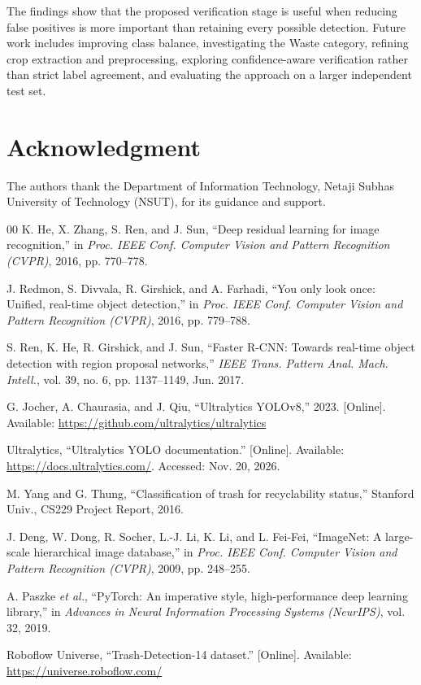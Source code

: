 \documentclass[conference]{IEEEtran}
\begin{document}
The findings show that the proposed verification stage is useful when reducing false positives is more important than retaining every possible detection. Future work includes improving class balance, investigating the Waste category, refining crop extraction and preprocessing, exploring confidence-aware verification rather than strict label agreement, and evaluating the approach on a larger independent test set.

\section*{Acknowledgment}
The authors thank the Department of Information Technology, Netaji Subhas University of Technology (NSUT), for its guidance and support.

\begin{thebibliography}{00}
K. He, X. Zhang, S. Ren, and J. Sun, ``Deep residual learning for image recognition,'' in \emph{Proc. IEEE Conf. Computer Vision and Pattern Recognition (CVPR)}, 2016, pp. 770--778.

J. Redmon, S. Divvala, R. Girshick, and A. Farhadi, ``You only look once: Unified, real-time object detection,'' in \emph{Proc. IEEE Conf. Computer Vision and Pattern Recognition (CVPR)}, 2016, pp. 779--788.

S. Ren, K. He, R. Girshick, and J. Sun, ``Faster R-CNN: Towards real-time object detection with region proposal networks,'' \emph{IEEE Trans. Pattern Anal. Mach. Intell.}, vol. 39, no. 6, pp. 1137--1149, Jun. 2017.

G. Jocher, A. Chaurasia, and J. Qiu, ``Ultralytics YOLOv8,'' 2023. [Online]. Available: \url{https://github.com/ultralytics/ultralytics}

Ultralytics, ``Ultralytics YOLO documentation.'' [Online]. Available: \url{https://docs.ultralytics.com/}. Accessed: Nov. 20, 2026.

M. Yang and G. Thung, ``Classification of trash for recyclability status,'' Stanford Univ., CS229 Project Report, 2016.

J. Deng, W. Dong, R. Socher, L.-J. Li, K. Li, and L. Fei-Fei, ``ImageNet: A large-scale hierarchical image database,'' in \emph{Proc. IEEE Conf. Computer Vision and Pattern Recognition (CVPR)}, 2009, pp. 248--255.

A. Paszke \emph{et al.}, ``PyTorch: An imperative style, high-performance deep learning library,'' in \emph{Advances in Neural Information Processing Systems (NeurIPS)}, vol. 32, 2019.

Roboflow Universe, ``Trash-Detection-14 dataset.'' [Online]. Available: \url{https://universe.roboflow.com/}
\end{thebibliography}
\end{document}
